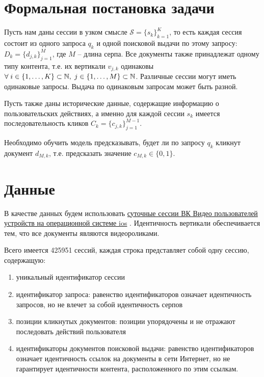 \documentclass[diploma]{nanolab2015}
\begin{document}
\section{Формальная постановка задачи}
Пусть нам даны сессии в узком смысле $\mathcal{S} = \{s_k\}_{k=1}^K$, то есть каждая сессия состоит из одного запроса $q_k$ и одной поисковой выдачи по этому запросу: $D_k = \{d_{j, k}\}_{j=1}^M$, где $M$ -- длина серпа. Все документы также принадлежат одному типу контента, т.е. их вертикали $v_{j, k}$ одинаковы $\forall \; \space i \in \{1, \dots, K\} \subset \mathbb{N}, \; j \in \{1, \dots, M\} \subset \mathbb{N}$. Различные сессии могут иметь одинаковые запросы. Выдача по одинаковым запросам может быть разной.

Пусть также даны исторические данные, содержащие информацию о пользовательских действиях, а именно для каждой сессии $s_k$ имеется последовательность кликов $C_k = \{c_{j,k}\}_{j=1}^{M-1}$.

Необходимо обучить модель предсказывать, будет ли по запросу $q_k$ кликнут документ $d_{M, k}$, т.е. предсказать значение $c_{M, k} \in \{0, 1\}$.

\section{Данные}
В качестве данных будем использовать \href{https://github.com/agcr/vk-msu-ir-course-spring-2024/blob/055b4329ad60466c238044d3d1d16d2b9c9764d9/seminars/6-behaviour-ranking/iphone-20240201.tsv.gz}{суточные сессии ВК Видео пользователей устройств на операционной системе ios} \cite{vkds}. Идентичность вертикали обеспечивается тем, что все документы являются видеороликами.

Всего имеется 425951 сессий, каждая строка представляет собой одну сессию, содержащую:

\begin{enumerate}
    \item уникальный идентификатор сессии
    \item идентификатор запроса: равенство идентификаторов означает идентичность запросов, но не влечет за собой идентичность серпов
    \item позиции кликнутых документов: позиции упорядочены и не отражают последовать действий пользователя
    \item идентификаторы документов поисковой выдачи: равенство идентификаторов означает идентичность ссылок на документы в сети Интернет, но не гарантирует идентичности контента, расположенного по этим ссылкам.
\end{enumerate}
\end{document}
